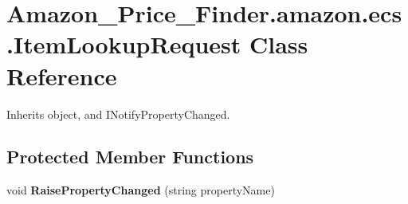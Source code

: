 \hypertarget{class_amazon___price___finder_1_1amazon_1_1ecs_1_1_item_lookup_request}{\section{Amazon\-\_\-\-Price\-\_\-\-Finder.\-amazon.\-ecs.\-Item\-Lookup\-Request Class Reference}
\label{class_amazon___price___finder_1_1amazon_1_1ecs_1_1_item_lookup_request}
}


 




Inherits object, and I\-Notify\-Property\-Changed.

\subsection*{Protected Member Functions}
\begin{DoxyCompactItemize}
\item 
\hypertarget{class_amazon___price___finder_1_1amazon_1_1ecs_1_1_item_lookup_request_ac16e6992a86baaf8b0ddfbab34408f44}{void {\bfseries Raise\-Property\-Changed} (string property\-Name)}\label{class_amazon___price___finder_1_1amazon_1_1ecs_1_1_item_lookup_request_ac16e6992a86baaf8b0ddfbab34408f44}

\end{DoxyCompactItemize}

